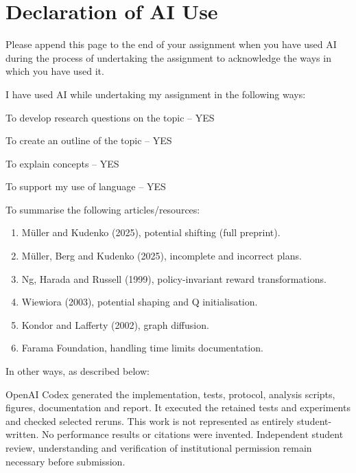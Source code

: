\section*{Declaration of AI Use}
Please append this page to the end of your assignment when you have used AI during the process of undertaking the assignment to acknowledge the ways in which you have used it.

\medskip\noindent I have used AI while undertaking my assignment in the following ways:

\medskip\noindent To develop research questions on the topic -- YES

\medskip\noindent To create an outline of the topic -- YES

\medskip\noindent To explain concepts -- YES

\medskip\noindent To support my use of language -- YES

\medskip\noindent To summarise the following articles/resources:
\begin{enumerate}
\item M{\"u}ller and Kudenko (2025), potential shifting (full preprint).
\item M{\"u}ller, Berg and Kudenko (2025), incomplete and incorrect plans.
\item Ng, Harada and Russell (1999), policy-invariant reward transformations.
\item Wiewiora (2003), potential shaping and Q initialisation.
\item Kondor and Lafferty (2002), graph diffusion.
\item Farama Foundation, handling time limits documentation.
\end{enumerate}

\noindent In other ways, as described below:

\medskip\noindent OpenAI Codex generated the implementation, tests, protocol, analysis scripts, figures, documentation and report. It executed the retained tests and experiments and checked selected reruns. This work is not represented as entirely student-written. No performance results or citations were invented. Independent student review, understanding and verification of institutional permission remain necessary before submission.
